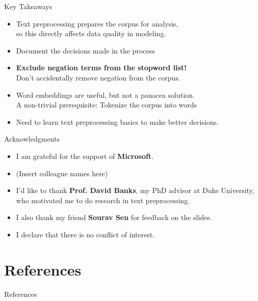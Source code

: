 \documentclass{beamer}
\renewcommand{\cite}{\citep}
\begin{document}




\begin{frame}{Key Takeaways}
\begin{itemize}
\item Text preprocessing prepares the corpus for analysis,\\
	so this directly affects data quality in modeling.
\item Document the decisions made in the process~\cite{nugent2020instead}
	\bigskip
\item \textbf{Exclude negation terms from the stopword list!}\\
	Don't accidentally remove negation from the corpus.
	\bigskip
\item Word embeddings are useful, but not a panacea solution.\\
	A non-trivial prerequisite: Tokenize the corpus into words\\
\item Need to learn text preprocessing basics to make better decisions.
\end{itemize}
\end{frame}

\begin{frame}{Acknowledgments}
\begin{itemize}
\item I am grateful for the support of \textbf{Microsoft}.
\item (Insert colleague names here)
	\bigskip
\item I'd like to thank \textbf{Prof. David Banks}, my PhD advisor at Duke University, who motivated me to do research in text preprocessing.
\item I also thank my friend \textbf{Sourav Sen} for feedback on the slides.
	\bigskip
\item I declare that there is no conflict of interest.
\end{itemize}
\end{frame}

\section{References}

\begin{frame}[t,allowframebreaks]{References}
\footnotesize


\end{frame}

\end{document}
